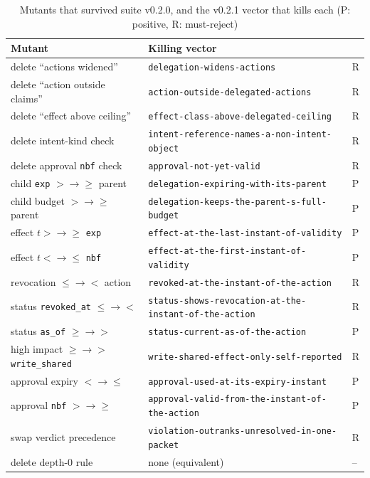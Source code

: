 \documentclass[conference]{IEEEtran}
\newcommand{\code}[1]{\texttt{\small #1}}
\newcommand{\vname}[1]{{\small\nolinkurl{#1}}}
\begin{document}
\begin{table}[t]
\caption{Mutants that survived suite v0.2.0, and the v0.2.1 vector that kills each (P: positive, R: must-reject)}\label{tab:surv}
\centering\footnotesize
\begin{tabular}{@{}p{5.2cm}p{8.2cm}l@{}}
\toprule
Mutant & Killing vector & \\
\midrule
delete ``actions widened'' & \vname{delegation-widens-actions} & R \\
delete ``action outside claims'' & \vname{action-outside-delegated-actions} & R \\
delete ``effect above ceiling'' & \vname{effect-class-above-delegated-ceiling} & R \\
delete intent-kind check & \vname{intent-reference-names-a-non-intent-object} & R \\
delete approval \code{nbf} check & \vname{approval-not-yet-valid} & R \\
child \code{exp} $>\to\ge$ parent & \vname{delegation-expiring-with-its-parent} & P \\
child budget $>\to\ge$ parent & \vname{delegation-keeps-the-parent-s-full-budget} & P \\
effect $t > \to \ge$ \code{exp} & \vname{effect-at-the-last-instant-of-validity} & P \\
effect $t < \to \le$ \code{nbf} & \vname{effect-at-the-first-instant-of-validity} & P \\
revocation $\le\to<$ action & \vname{revoked-at-the-instant-of-the-action} & R \\
status \code{revoked\_at} $\le\to<$ & \vname{status-shows-revocation-at-the-instant-of-the-action} & R \\
status \code{as\_of} $\ge\to>$ & \vname{status-current-as-of-the-action} & P \\
high impact $\ge\to>$ \code{write\_shared} & \vname{write-shared-effect-only-self-reported} & R \\
approval expiry $<\to\le$ & \vname{approval-used-at-its-expiry-instant} & P \\
approval \code{nbf} $>\to\ge$ & \vname{approval-valid-from-the-instant-of-the-action} & P \\
swap verdict precedence & \vname{violation-outranks-unresolved-in-one-packet} & R \\
delete depth-0 rule & none (equivalent) & -- \\
\bottomrule
\end{tabular}
\end{table}
\end{document}
